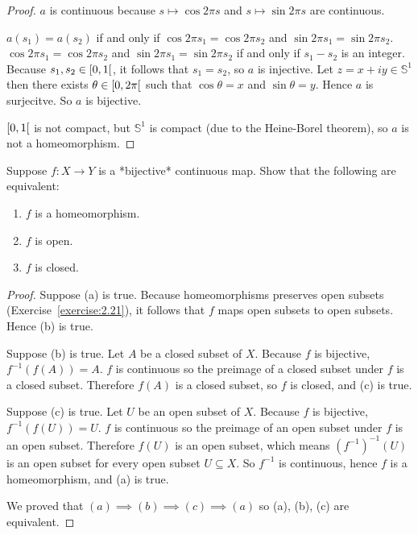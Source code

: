 \begin{proof}
	$a$ is continuous because $s\mapsto \cos 2\pi s$ and $s\mapsto \sin 2\pi s$ are continuous.

	$a(s_{1}) = a(s_{2})$ if and only if $\cos 2\pi s_{1} = \cos 2\pi s_{2}$ and $\sin 2\pi s_{1} = \sin 2\pi s_{2}$. $\cos 2\pi s_{1} = \cos 2\pi s_{2}$ and $\sin 2\pi s_{1} = \sin 2\pi s_{2}$ if and only if $s_{1} - s_{2}$ is an integer. Because $s_{1}, s_{2}\in \left[{0,1}\right[$, it follows that $s_{1} = s_{2}$, so $a$ is injective. Let $z = x + i y\in \mathbb{S}^{1}$ then there exists $\theta\in\left[{0, 2\pi}\right[$ such that $\cos\theta = x$ and $\sin\theta = y$. Hence $a$ is surjecitve. So $a$ is bijective.

	$\left[{0, 1}\right[$ is not compact, but $\mathbb{S}^{1}$ is compact (due to the Heine-Borel theorem), so $a$ is not a homeomorphism.
\end{proof}

\begin{exercise}{2.29}\label{exercise.2.29}
	Suppose $f: X\to Y$ is a *bijective* continuous map. Show that the following are equivalent:

	\begin{enumerate}[label={(\alph*)}]
		\item $f$ is a homeomorphism.
		\item $f$ is open.
		\item $f$ is closed.
	\end{enumerate}
\end{exercise}

\begin{proof}
	Suppose (a) is true. Because homeomorphisms preserves open subsets (Exercise~\ref{exercise:2.21}), it follows that $f$ maps open subsets to open subsets. Hence (b) is true.

	Suppose (b) is true. Let $A$ be a closed subset of $X$. Because $f$ is bijective, $f^{-1}(f(A)) = A$. $f$ is continuous so the preimage of a closed subset under $f$ is a closed subset. Therefore $f(A)$ is a closed subset, so $f$ is closed, and (c) is true.

	Suppose (c) is true. Let $U$ be an open subset of $X$. Because $f$ is bijective, $f^{-1}(f(U)) = U$. $f$ is continuous so the preimage of an open subset under $f$ is an open subset. Therefore $f(U)$ is an open subset, which means ${(f^{-1})}^{-1}(U)$ is an open subset for every open subset $U\subseteq X$. So $f^{-1}$ is continuous, hence $f$ is a homeomorphism, and (a) is true.

	We proved that $(a)\implies (b) \implies (c) \implies (a)$ so (a), (b), (c) are equivalent.
\end{proof}


